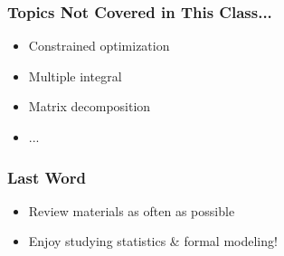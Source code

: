 \documentclass[pdflatex, 12pt]{beamer}
\begin{document}
\begin{frame}
\frametitle{Topics Not Covered in This Class...}
\begin{itemize}
\item Constrained optimization
\vspace{0.4cm}
\item Multiple integral
\vspace{0.4cm}
\item Matrix decomposition
\vspace{0.4cm}
\item ...
\end{itemize}
\end{frame}

\begin{frame}
\frametitle{Last Word}
\begin{itemize}
\item Review materials as often as possible
\vspace{0.4cm}
\item Enjoy studying statistics \& formal modeling!
\end{itemize}
\end{frame}
\end{document}
